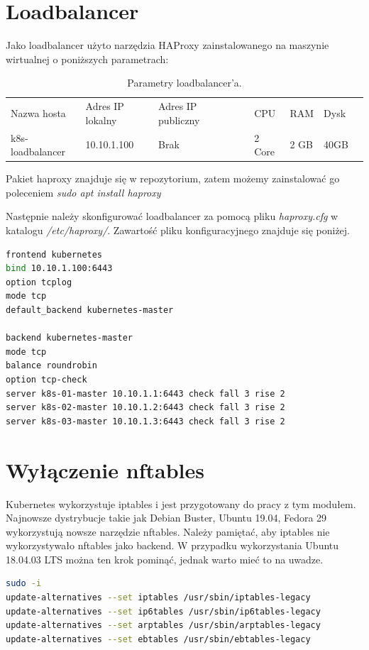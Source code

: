 \documentclass[pl,final,oneside]{mgr} %
\begin{document}
\section{Loadbalancer}
Jako loadbalancer użyto narzędzia HAProxy zainstalowanego na maszynie wirtualnej o poniższych parametrach:
\begin{table}[h!]
	\begin{tabular}{lllllllll}
		Nazwa hosta   & Adres IP lokalny & Adres IP publiczny &  &  & CPU    & RAM  & Dysk &  \\
		k8s-loadbalancer & 10.10.1.100        & Brak     &  &  & 2 Core & 2 GB & 40GB & 
	\end{tabular}
	\label{tab:kvm_lb}
	\caption{Parametry loadbalancer'a.}
\end{table}
Pakiet haproxy znajduje się w repozytorium, zatem możemy zainstalować go poleceniem \textit{sudo apt install haproxy}

Następnie należy skonfigurować loadbalancer za pomocą pliku \textit{haproxy.cfg} w katalogu \textit{/etc/haproxy/}. Zawartość pliku konfiguracyjnego znajduje się poniżej.

\begin{lstlisting}[language=Bash]
frontend kubernetes
bind 10.10.1.100:6443
option tcplog
mode tcp
default_backend kubernetes-master

backend kubernetes-master
mode tcp
balance roundrobin
option tcp-check
server k8s-01-master 10.10.1.1:6443 check fall 3 rise 2
server k8s-02-master 10.10.1.2:6443 check fall 3 rise 2
server k8s-03-master 10.10.1.3:6443 check fall 3 rise 2
\end{lstlisting}


\section{Wyłączenie nftables}
Kubernetes wykorzystuje iptables i jest przygotowany do pracy z tym modułem. Najnowsze dystrybucje takie jak Debian Buster, Ubuntu 19.04, Fedora 29 wykorzystują nowsze narzędzie nftables. Należy pamiętać, aby iptables nie wykorzystywało nftables jako backend. W przypadku wykorzystania Ubuntu 18.04.03 LTS można ten krok pominąć, jednak warto mieć to na uwadze.
\begin{lstlisting}[language=Bash]
sudo -i
update-alternatives --set iptables /usr/sbin/iptables-legacy
update-alternatives --set ip6tables /usr/sbin/ip6tables-legacy
update-alternatives --set arptables /usr/sbin/arptables-legacy
update-alternatives --set ebtables /usr/sbin/ebtables-legacy
\end{lstlisting}
\end{document}
